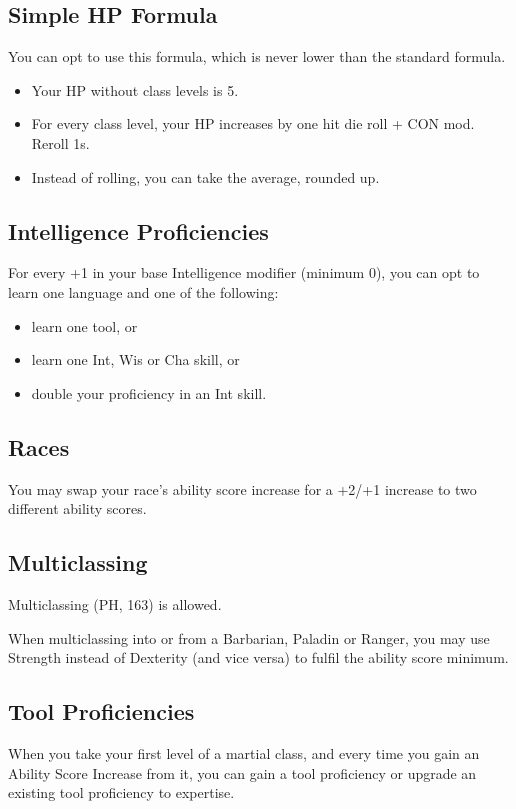 \documentclass[letterpaper,twocolumn,openany,nodeprecatedcode,bg=print]{dndbook}
\begin{document}
\subsection{Simple HP Formula}
You can opt to use this formula, which is never lower than the standard formula.
\begin{itemize}
\item Your HP without class levels is 5.
\item For every class level, your HP increases by one hit die roll + CON mod. Reroll 1s. 
\item Instead of rolling, you can take the average, rounded up.
\end{itemize}

\subsection{Intelligence Proficiencies}
For every +1 in your base Intelligence modifier (minimum 0), you can opt to learn one language and one of the following:
\begin{itemize}
    \item learn one tool, or
    \item learn one Int, Wis or Cha skill, or
    \item double your proficiency in an Int skill.
\end{itemize}



\subsection{Races}
You may swap your race's ability score increase for a +2/+1 increase to two different ability scores.

\subsection{Multiclassing}
Multiclassing (PH, 163) is allowed. 

When multiclassing into or from a Barbarian, Paladin or Ranger, you may use Strength instead of Dexterity (and vice versa) to fulfil the ability score minimum. 

\subsection{Tool Proficiencies}
When you take your first level of a martial class, and every time you gain an Ability Score Increase from it, you can gain a tool proficiency or upgrade an existing tool proficiency to expertise. 
\end{document}
